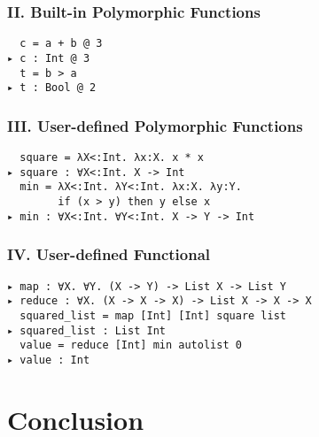 \documentclass{beamer}
\begin{document}
\begin{frame}[fragile]
    \frametitle{II. Built-in Polymorphic Functions}

    \begin{example}
        \verb|  c = a + b @ 3|
        \\
        \verb|▸ c : Int @ 3|
        \\
        \verb|  t = b > a|
        \\
        \verb|▸ t : Bool @ 2|
    \end{example}

\end{frame}
\begin{frame}[fragile]
    \frametitle{III. User-defined Polymorphic Functions}
\begin{example}
    \verb|  square = λX<:Int. λx:X. x * x|
    \\
    \verb|▸ square : ∀X<:Int. X -> Int|
    \\
    \verb|  min = λX<:Int. λY<:Int. λx:X. λy:Y.|
    \\
    \verb|        if (x > y) then y else x|
    \\
    \verb|▸ min : ∀X<:Int. ∀Y<:Int. X -> Y -> Int|
\end{example}

\end{frame}

\begin{frame}[fragile]
    \frametitle{IV. User-defined Functional}

    \begin{example}
        \verb|▸ map : ∀X. ∀Y. (X -> Y) -> List X -> List Y|
        \\
        \verb|▸ reduce : ∀X. (X -> X -> X) -> List X -> X -> X|
        \\
        \verb|  squared_list = map [Int] [Int] square list|
        \\
        \verb|▸ squared_list : List Int|
        \\
        \verb|  value = reduce [Int] min autolist 0|
        \\
        \verb|▸ value : Int|
    \end{example}    

\end{frame}

\section{Conclusion}
\end{document}
